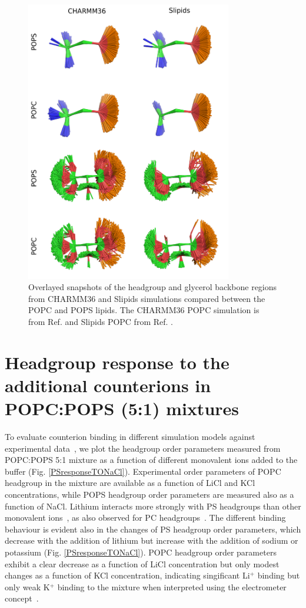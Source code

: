 \documentclass[journal=jpcbfk]{achemso}
\begin{document}
\begin{figure}[]
  \centering
  \includegraphics[width=9.0cm]{../Figs/figS8_POPC.png}
  \caption{\label{HGandGLYstructuresPSPC}
    Overlayed snapshots of the headgroup and glycerol backbone regions 
    from CHARMM36 and Slipids simulations compared between the POPC and POPS lipids.
    The CHARMM36 POPC simulation is from Ref.  and Slipids POPC from Ref. .
  }
\end{figure}




\pagebreak

\section{Headgroup response to the additional counterions in POPC:POPS (5:1) mixtures}\label{mixtureTOadditionalCIs}
To evaluate counterion binding in different simulation models against experimental data~\cite{roux90},
we plot the headgroup order parameters measured from POPC:POPS 5:1 mixture
as a function of different monovalent ions added to the buffer (Fig. \ref{PSresponseTONaCl}). 
Experimental order parameters of POPC headgroup in the mixture are available as a function
of LiCl and KCl concentrations, while POPS headgroup order parameters are measured also
as a function of NaCl. Lithium interacts more strongly with PS headgroups than other monovalent 
ions~\cite{hauser83,hauser85,roux86,mattai89,roux90}, as also observed for PC headgroups~\cite{cevc90}. 
The different binding behaviour is evident also in the changes of PS headgroup order parameters, which decrease with the addition of lithium 
but increase with the addition of sodium or potassium (Fig. \ref{PSresponseTONaCl}). 
POPC headgroup order parameters exhibit a clear decrease as a function of LiCl concentration
but only modest changes as a function of KCl concentration, indicating singificant 
Li$^+$ binding but only weak K$^+$ binding to the mixture when interpreted using the
electrometer concept~\cite{akutsu81,altenbach84,seelig87}.
\end{document}
